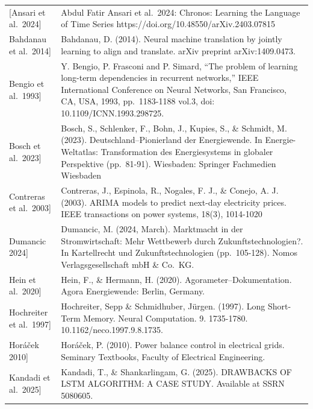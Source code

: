 \documentclass[a4paper]{article}
\begin{document}
{\fontsize{8pt}{10pt}\selectfont\begin{longtable}[]{@{}
  >{\raggedright\arraybackslash}p{}
  >{\raggedright\arraybackslash}p{}@{}}
\toprule\noalign{}
\endhead
\bottomrule\noalign{}
\endlastfoot
{[}Ansari et al.~2024{]} & Abdul Fatir Ansari et al.~2024: Chronos:
Learning the Language of Time Series
https://doi.org/10.48550/arXiv.2403.07815 \\
{[}Bahdanau et al.~2014{]} & Bahdanau, D. (2014). Neural machine
translation by jointly learning to align and translate. arXiv preprint
arXiv:1409.0473. \\
{[}Bengio et al.~1993{]} & Y. Bengio, P. Frasconi and P. Simard, ``The
problem of learning long-term dependencies in recurrent networks,'' IEEE
International Conference on Neural Networks, San Francisco, CA, USA,
1993, pp.~1183-1188 vol.3, doi: 10.1109/ICNN.1993.298725. \\
{[}Bosch et al.~2023{]} & Bosch, S., Schlenker, F., Bohn, J., Kupies,
S., \& Schmidt, M. (2023). Deutschland--Pionierland der Energiewende. In
Energie-Weltatlas: Transformation des Energiesystems in globaler
Perspektive (pp.~81-91). Wiesbaden: Springer Fachmedien Wiesbaden \\
{[}Contreras et al.~2003{]} & Contreras, J., Espinola, R., Nogales, F.
J., \& Conejo, A. J. (2003). ARIMA models to predict next-day
electricity prices. IEEE transactions on power systems, 18(3),
1014-1020 \\
{[}Dumancic 2024{]} & Dumancic, M. (2024, March). Marktmacht in der
Stromwirtschaft: Mehr Wettbewerb durch Zukunftstechnologien?. In
Kartellrecht und Zukunftstechnologien (pp.~105-128). Nomos
Verlagsgesellschaft mbH \& Co.~KG. \\
{[}Hein et al.~2020{]} & Hein, F., \& Hermann, H. (2020).
Agorameter--Dokumentation. Agora Energiewende: Berlin, Germany. \\
{[}Hochreiter et al.~1997{]} & Hochreiter, Sepp \& Schmidhuber, Jürgen.
(1997). Long Short-Term Memory. Neural Computation. 9. 1735-1780.
10.1162/neco.1997.9.8.1735. \\
{[}Horáček 2010{]} & Horáček, P. (2010). Power balance control in
electrical grids. Seminary Textbooks, Faculty of Electrical
Engineering. \\
{[}Kandadi et al.~2025{]} & Kandadi, T., \& Shankarlingam, G. (2025).
DRAWBACKS OF LSTM ALGORITHM: A CASE STUDY. Available at SSRN 5080605. \\

\end{longtable}}
\end{document}
